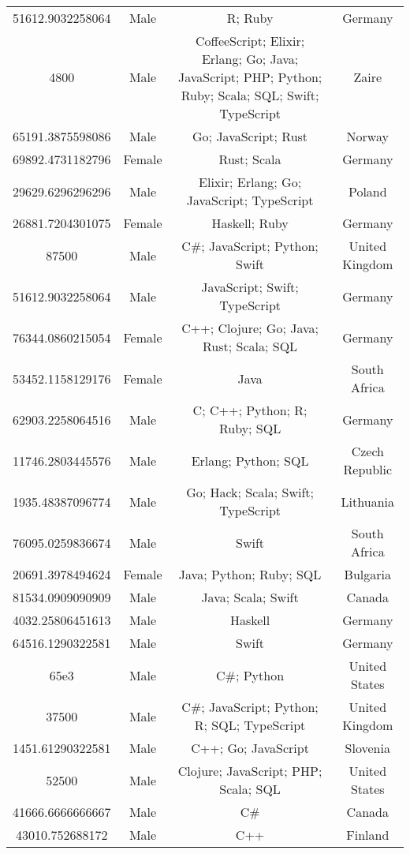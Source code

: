 \begin{center}
\begin{tabular}{ |c|c|c|c| }
51612.9032258064  &  Male  &  R; Ruby  &  Germany  \\ 
4800  &  Male  &  CoffeeScript; Elixir; Erlang; Go; Java; JavaScript; PHP; Python; Ruby; Scala; SQL; Swift; TypeScript  &  Zaire  \\ 
65191.3875598086  &  Male  &  Go; JavaScript; Rust  &  Norway  \\ 
69892.4731182796  &  Female  &  Rust; Scala  &  Germany  \\ 
29629.6296296296  &  Male  &  Elixir; Erlang; Go; JavaScript; TypeScript  &  Poland  \\ 
26881.7204301075  &  Female  &  Haskell; Ruby  &  Germany  \\ 
87500  &  Male  &  C\#; JavaScript; Python; Swift  &  United Kingdom  \\ 
51612.9032258064  &  Male  &  JavaScript; Swift; TypeScript  &  Germany  \\ 
76344.0860215054  &  Female  &  C++; Clojure; Go; Java; Rust; Scala; SQL  &  Germany  \\ 
53452.1158129176  &  Female  &  Java  &  South Africa  \\ 
62903.2258064516  &  Male  &  C; C++; Python; R; Ruby; SQL  &  Germany  \\ 
11746.2803445576  &  Male  &  Erlang; Python; SQL  &  Czech Republic  \\ 
1935.48387096774  &  Male  &  Go; Hack; Scala; Swift; TypeScript  &  Lithuania  \\ 
76095.0259836674  &  Male  &  Swift  &  South Africa  \\ 
20691.3978494624  &  Female  &  Java; Python; Ruby; SQL  &  Bulgaria  \\ 
81534.0909090909  &  Male  &  Java; Scala; Swift  &  Canada  \\ 
4032.25806451613  &  Male  &  Haskell  &  Germany  \\ 
64516.1290322581  &  Male  &  Swift  &  Germany  \\ 
65e3  &  Male  &  C\#; Python  &  United States  \\ 
37500  &  Male  &  C\#; JavaScript; Python; R; SQL; TypeScript  &  United Kingdom  \\ 
1451.61290322581  &  Male  &  C++; Go; JavaScript  &  Slovenia  \\ 
52500  &  Male  &  Clojure; JavaScript; PHP; Scala; SQL  &  United States  \\ 
41666.6666666667  &  Male  &  C\#  &  Canada  \\ 
43010.752688172  &  Male  &  C++  &  Finland  \\ 

\end{tabular}
\end{center}
